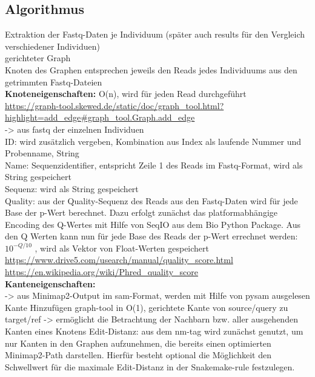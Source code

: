 \subsection{Algorithmus} \label{subsec:}
Extraktion der Fastq-Daten je Individuum (später auch results für den Vergleich verschiedener Individuen) \\
gerichteter Graph \\
Knoten des Graphen entsprechen jeweils den Reads jedes Individuums aus den getrimmten Fastq-Dateien \\
\textbf{Knoteneigenschaften:} O(n), wird für jeden Read durchgeführt \\
    \url{https://graph-tool.skewed.de/static/doc/graph_tool.html?highlight=add_edge#graph_tool.Graph.add_edge} \\
    -> aus fastq der einzelnen Individuen \\
    ID: wird zusätzlich vergeben, Kombination aus Index als laufende Nummer und Probenname, String \\
    Name: Sequenzidentifier, entspricht Zeile 1 des Reads im Fastq-Format, wird als String gespeichert \\
    Sequenz: wird als String gespeichert \\
    Quality: aus der Quality-Sequenz des Reads aus den Fastq-Daten wird für jede Base der p-Wert berechnet. Dazu erfolgt zunächst das platformabhängige Encoding des Q-Wertes mit Hilfe von SeqIO aus dem Bio Python Package. Aus den Q Werten kann nun für jede Base des Reads der p-Wert errechnet werden: $10^{-Q / 10}$ , wird als Vektor von Float-Werten gespeichert \\
        \url{https://www.drive5.com/usearch/manual/quality_score.html}  \\
        \url{https://en.wikipedia.org/wiki/Phred_quality_score} \\
        
\noindent\textbf{Kanteneigenschaften:} \\ 
    -> aus Minimap2-Output im sam-Format, werden mit Hilfe von pysam ausgelesen\\
    Kante Hinzufügen graph-tool in O(1), gerichtete Kante von source/query zu target/ref -> ermöglicht die Betrachtung der Nachbarn bzw. aller ausgehenden Kanten eines Knotens
    Edit-Distanz: aus dem nm-tag wird zunächst genutzt, um nur Kanten in den Graphen aufzunehmen, die bereits einen optimierten Minimap2-Path darstellen. Hierfür besteht optional die Möglichkeit den Schwellwert für die maximale Edit-Distanz in der Snakemake-rule festzulegen.\\
        
